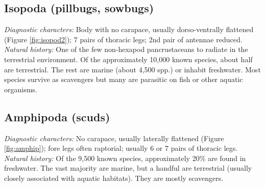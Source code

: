 \documentclass[letterpaper, 11pt]{article}
\begin{document}
\subsection{Isopoda (pillbugs, sowbugs)}
\noindent{}\textit{Diagnostic characters:} Body with no carapace, usually dorso-ventrally flattened (Figure \ref{fig:isopod2}); 7 pairs of thoracic legs; 2nd pair of antennae reduced.\\

\noindent{}\textit{Natural history:} One of the few non-hexapod pancrustaceans to radiate in the terrestrial environment. Of the approximately 10,000 known species, about half are terrestrial. The rest are marine (about 4,500 spp.) or inhabit freshwater. Most species survive as scavengers but many are parasitic on fish or other aquatic organisms.\\

\subsection{Amphipoda (scuds)}
\noindent{}\textit{Diagnostic characters:} No carapace, usually laterally flattened (Figure \ref{fig:amphip}); fore legs often raptorial; usually 6 or 7 pairs of thoracic legs.\\

\noindent{}\textit{Natural history:} Of the 9,500 known species, approximately 20\% are found in freshwater. The vast majority are marine, but a handful are terrestrial (usually closely associated with aquatic habitats). They are mostly scavengers.\\
\end{document}

